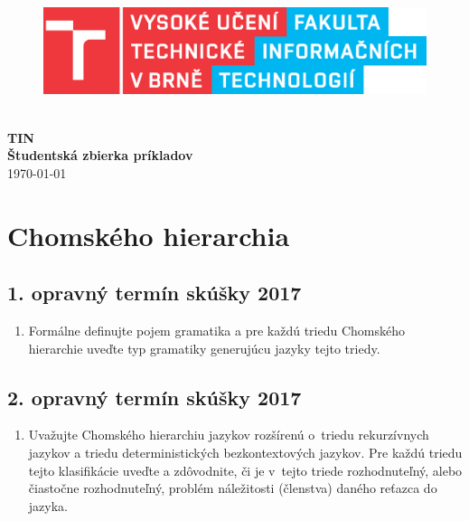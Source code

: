 \documentclass[11pt,a4paper]{article}
\begin{document}
	\begin{titlepage}
		\begin{center}
			\hfill\\[20em]
			\begin{figure}[H]
				\centering
				\includegraphics[scale=0.8]{logo.eps}
			\end{figure}
			\hfill\\[1em]
			\Huge{
				\textbf{
					TIN
				}
			}
			\hfill\\[1em]
			\huge{
				\textbf{
					Študentská zbierka príkladov
				} \\
				\today
			}
		\end{center}
	\end{titlepage}
	\newpage

	\tableofcontents
	\newpage

	\section{Chomského hierarchia}

		\subsection{1. opravný termín skúšky 2017}

		\begin{enumerate}
			\item Formálne definujte pojem gramatika a pre každú triedu Chomského hierarchie uveďte typ gramatiky generujúcu jazyky tejto triedy.
		\end{enumerate}

		\subsection{2. opravný termín skúšky 2017}

		\begin{enumerate}
			\item Uvažujte Chomského hierarchiu jazykov rozšírenú o~triedu rekurzívnych jazykov a triedu deterministických bezkontextových jazykov. Pre každú triedu tejto klasifikácie uveďte a zdôvodnite, či je v~tejto triede rozhodnuteľný, alebo čiastočne rozhodnuteľný, problém náležitosti (členstva) daného reťazca do jazyka.
		\end{enumerate}
\end{document}
